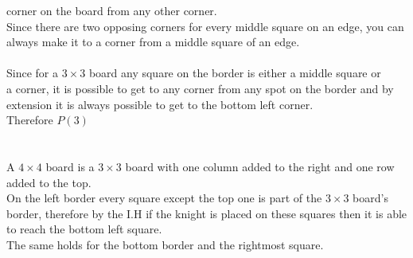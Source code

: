\documentclass[11pt]{article}
\begin{document}
\begin{enumerate}
\begin{enumerate}
\begin{solution}
\null\qquad corner on the board from any other corner.\\
\null\qquad Since there are two opposing corners for every middle square on an edge, you can \\
\null\qquad always make it to a corner from a middle square of an edge.\\\\
\null\qquad Since for a $3\times 3$ board any square on the border is either a middle square or   \\
\null\qquad a corner, it is possible to get to any corner from any spot on the border and by \\
\null\qquad extension it is always possible to get to the bottom left corner.\\
\null\quad Therefore $P(3)$\\\\
\null{}\\
\null\qquad A $4\times4$ board is a $3\times3$ board with one column added to the right and one row\\
\null\qquad added to the top.\\
\null\qquad On the left border every square except the top one is part of the $3\times 3$ board's\\
\null\qquad border, therefore by the I.H if the knight is placed on these squares then it is able \\
\null\qquad to reach the bottom left square.\\
\null\qquad The same holds for the bottom border and the rightmost square.\\


\end{solution}
\end{enumerate}
\end{enumerate}
\end{document}
